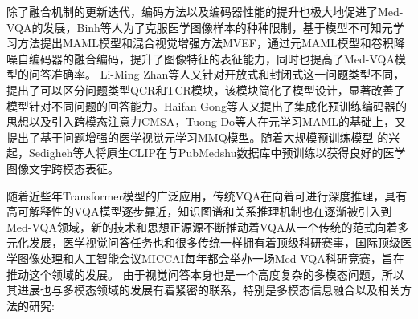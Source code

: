 除了融合机制的更新迭代，编码方法以及编码器性能的提升也极大地促进了Med-VQA的发展，Binh等人\cite{nguyen2019overcoming}为了克服医学图像样本的种种限制，基于模型不可知元学习方法提出MAML模型和混合视觉增强方法MVEF，通过元MAML模型和卷积降噪自编码器\cite{masci2011stacked}的融合编码，提升了图像特征的表征能力，同时也提高了Med-VQA模型的问答准确率。
Li-Ming Zhan等人\cite{zhan2020medical}又针对开放式和封闭式这一问题类型不同，提出了可以区分问题类型QCR和TCR模块，该模块简化了模型设计，显著改善了模型针对不同问题的回答能力。Haifan Gong等人\cite{gong2021cross}又提出了集成化预训练编码器的思想以及引入跨模态注意力CMSA，Tuong Do等人\cite{do2021multiple}在元学习MAML的基础上，又提出了基于问题增强的医学视觉元学习MMQ模型。随着大规模预训练模型
的兴起，Sedigheh等人\cite{eslami2021does}将原生CLIP在与PubMedshu数据库中预训练以获得良好的医学图像文字跨模态表征。

随着近些年Transformer模型\cite{vaswani2017attention}的广泛应用，传统VQA在向着可进行深度推理，具有高可解释性的VQA模型逐步靠近，知识图谱和关系推理机制也在逐渐被引入到Med-VQA领域\cite{chen2022align}，新的技术和思想正源源不断推动着VQA从一个传统的范式向着多元化发展\cite{lin2021medical}，医学视觉问答任务也和很多传统一样拥有着顶级科研赛事，国际顶级医学图像处理和人工智能会议MICCAI每年都会举办一场Med-VQA科研竞赛\cite{ben2021overview}，旨在推动这个领域的发展。
由于视觉问答本身也是一个高度复杂的多模态问题，所以其进展也与多模态领域的发展有着紧密的联系，特别是多模态信息融合以及相关方法的研究\cite{ngiam2011multimodal}:


